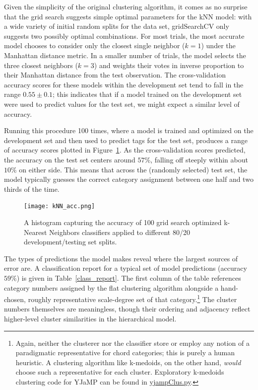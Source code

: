 Given the simplicity of the original clustering algorithm, it comes as no surprise that the grid search suggests simple optimal parameters for the kNN model: with a wide variety of initial random splits for the data set, gridSearchCV only suggests two possibly optimal combinations.  For most trials, the most accurate model chooses to consider only the closest single neighbor ($k=1$) under the Manhattan distance metric.  In a smaller number of trials, the model selects the three closest neighbors ($k=3$) and weights their votes in inverse proportion to their Manhattan distance from the test observation.  The cross-validation accuracy scores for these models within the development set tend to fall in the range $0.55 \pm 0.1$; this indicates that if a model trained on the development set were used to predict values for the test set, we might expect a similar level of accuracy.

Running this procedure 100 times, where a model is trained and optimized on the development set and then used to predict tags for the test set, produces a range of accuracy scores plotted in Figure~\ref{kNN}.  As the cross-validation scores predicted, the accuracy on the test set centers around $57\%$, falling off steeply within about $10\%$ on either side.  This means that across the (randomly selected) test set, the model typically guesses the correct category assignment between one half and two thirds of the time.

\begin{figure}
	\centering
	\caption{A histogram capturing the accuracy of 100 grid search optimized k-Nearest Neighbors classifiers applied to different 80/20 development/testing set splits.}
	\texttt{[image: kNN\_acc.png]}
	\label{kNN}
\end{figure}

The types of predictions the model makes reveal where the largest sources of error are.  A classification report for a typical set of model predictions (accuracy $59\%$) is given in Table~\ref{class_report}.  The first column of the table references category numbers assigned by the flat clustering algorithm alongside a hand-chosen, roughly representative scale-degree set of that category.\footnote{Again, neither the clusterer nor the classifier store or employ any notion of a paradigmatic representative for chord categories; this is purely a human heuristic.  A clustering algorithm like k-medoids, on the other hand, \emph{would} choose such a representative for each cluster.  Exploratory k-medoids clustering code for YJaMP can be found in \href{https://github.com/andrewdjones/YJaMP_Analysis/blob/master/yjampClus.py}{yjampClus.py}.}  The cluster numbers themselves are meaningless, though their ordering and adjacency reflect higher-level cluster similarities in the hierarchical model.

